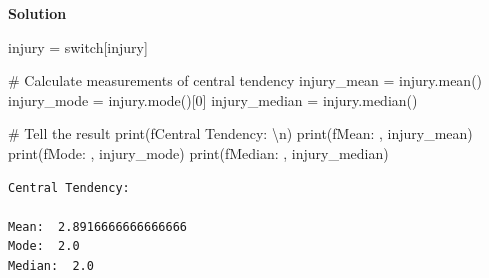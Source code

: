 \documentclass[
  a4paper,
  DIV=11,
  numbers=noendperiod]{scrartcl}
\newenvironment{Shaded}{\begin{snugshade}}{\end{snugshade}}
\newcommand{\BuiltInTok}[1]{\textcolor[rgb]{0.00,0.23,0.31}{#1}}
\newcommand{\CharTok}[1]{\textcolor[rgb]{0.13,0.47,0.30}{#1}}
\newcommand{\CommentTok}[1]{\textcolor[rgb]{0.37,0.37,0.37}{#1}}
\newcommand{\DecValTok}[1]{\textcolor[rgb]{0.68,0.00,0.00}{#1}}
\newcommand{\NormalTok}[1]{\textcolor[rgb]{0.00,0.23,0.31}{#1}}
\newcommand{\OperatorTok}[1]{\textcolor[rgb]{0.37,0.37,0.37}{#1}}
\newcommand{\SpecialStringTok}[1]{\textcolor[rgb]{0.13,0.47,0.30}{#1}}
\newcommand{\StringTok}[1]{\textcolor[rgb]{0.13,0.47,0.30}{#1}}
\begin{document}
\textbf{Solution}

\begin{Shaded}
\begin{Highlighting}[numbers=left,,]
\NormalTok{injury }\OperatorTok{=}\NormalTok{ switch[}\StringTok{\textquotesingle{}injury\textquotesingle{}}\NormalTok{]}

\CommentTok{\# Calculate measurements of central tendency}
\NormalTok{injury\_mean }\OperatorTok{=}\NormalTok{ injury.mean()}
\NormalTok{injury\_mode }\OperatorTok{=}\NormalTok{ injury.mode()[}\DecValTok{0}\NormalTok{]}
\NormalTok{injury\_median }\OperatorTok{=}\NormalTok{ injury.median()}

\CommentTok{\# Tell the result}
\BuiltInTok{print}\NormalTok{(}\SpecialStringTok{f\textquotesingle{}Central Tendency: }\CharTok{\textbackslash{}n}\SpecialStringTok{\textquotesingle{}}\NormalTok{)}
\BuiltInTok{print}\NormalTok{(}\SpecialStringTok{f\textquotesingle{}Mean: \textquotesingle{}}\NormalTok{, injury\_mean)}
\BuiltInTok{print}\NormalTok{(}\SpecialStringTok{f\textquotesingle{}Mode: \textquotesingle{}}\NormalTok{, injury\_mode)}
\BuiltInTok{print}\NormalTok{(}\SpecialStringTok{f\textquotesingle{}Median: \textquotesingle{}}\NormalTok{, injury\_median)}
\end{Highlighting}
\end{Shaded}

\begin{verbatim}
Central Tendency: 

Mean:  2.8916666666666666
Mode:  2.0
Median:  2.0
\end{verbatim}
\end{document}
